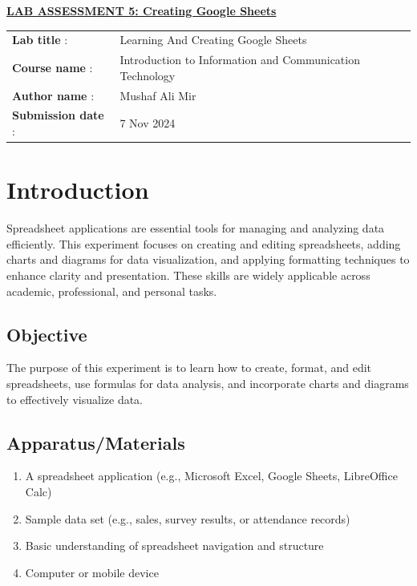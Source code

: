 \documentclass[a4paper,9pt]{article}
\begin{document}
\begin{center}
	{\Huge \bfseries \underline{ LAB ASSESSMENT 5: Creating Google Sheets } \par}
\end{center}
\noindent\begin{tabular}{@{}ll}
	\textbf{Lab title} :&Learning And Creating Google Sheets \\
	\textbf{Course name} :&  Introduction to Information and Communication Technology\\
	\textbf{Author name} : & Mushaf Ali Mir\\
	\textbf{Submission date} :& 7 Nov 2024 \\
\end{tabular}

\section*{Introduction}
\setcounter{section}{5}
\setcounter{figure}{0}  %
\setcounter{subsection}{0}

Spreadsheet applications are essential tools for managing and analyzing data efficiently. This experiment focuses on creating and editing spreadsheets, adding charts and diagrams for data visualization, and applying formatting techniques to enhance clarity and presentation. These skills are widely applicable across academic, professional, and personal tasks.

\subsection{Objective}
The purpose of this experiment is to learn how to create, format, and edit spreadsheets, use formulas for data analysis, and incorporate charts and diagrams to effectively visualize data.

\subsection{Apparatus/Materials}
\begin{enumerate}
	\item A spreadsheet application (e.g., Microsoft Excel, Google Sheets, LibreOffice Calc)
	\item Sample data set (e.g., sales, survey results, or attendance records)
	\item Basic understanding of spreadsheet navigation and structure
	\item Computer or mobile device
	
\end{enumerate}
\end{document}
